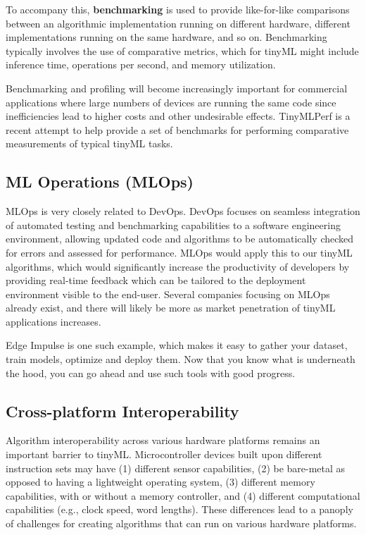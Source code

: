 To accompany this, \textbf{benchmarking} is used to provide like-for-like comparisons between an algorithmic implementation running on different hardware, different implementations running on the same hardware, and so on. Benchmarking typically involves the use of comparative metrics, which for tinyML might include inference time, operations per second, and memory utilization.
    
    Benchmarking and profiling will become increasingly important for commercial applications where large numbers of devices are running the same code since inefficiencies lead to higher costs and other undesirable effects. TinyMLPerf is a recent attempt to help provide a set of benchmarks for performing comparative measurements of typical tinyML tasks.
    
\subsection{ML Operations (MLOps)}

MLOps is very closely related to DevOps. DevOps focuses on seamless integration of automated testing and benchmarking capabilities to a software engineering environment, allowing updated code and algorithms to be automatically checked for errors and assessed for performance. MLOps would apply this to our tinyML algorithms, which would significantly increase the productivity of developers by providing real-time feedback which can be tailored to the deployment environment visible to the end-user. Several companies focusing on MLOps already exist, and there will likely be more as market penetration of tinyML applications increases.
    
    Edge Impulse is one such example, which makes it easy to gather your dataset, train models, optimize and deploy them. Now that you know what is underneath the hood, you can go ahead and use such tools with good progress.
    
\subsection{Cross-platform Interoperability}

    Algorithm interoperability across various hardware platforms remains an important barrier to tinyML. Microcontroller devices built upon different instruction sets may have (1) different sensor capabilities, (2) be bare-metal as opposed to having a lightweight operating system, (3) different memory capabilities, with or without a memory controller, and (4) different computational capabilities (e.g., clock speed, word lengths). These differences lead to a panoply of challenges for creating algorithms that can run on various hardware platforms.
    
